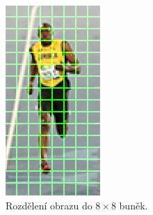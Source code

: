  \begin{figure}[H]
\centering
\includegraphics[width=3.6cm]{figures/hog_cells}
\caption{Rozdělení obrazu do $8\times8$ buněk. \cite{hog:obr}}
\label{hog_cells}
\end{figure}

